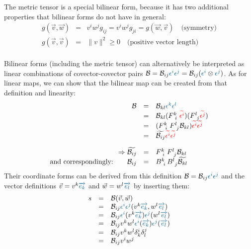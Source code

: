 The metric tensor is a special bilinear form, because it has two additional properties
that bilinear forms do not have in general:
\begin{equation}
    \label{eq:metric_tensor_special_additional_properties}
    \begin{array}{rcl}
        g(\vec{v},\vec{w}) &=& v^i w^j g_{ij} = v^i w^j g_{ji} = g(\vec{w},\vec{v})
        \quad\text{(symmetry)}\\
        g(\vec{v},\vec{v}) &=& \| v \|^2 \geq 0
        \quad\text{(positive vector length)}
    \end{array}
\end{equation} \\

Bilinear forms (including the metric tensor) can alternatively be interpreted as linear
combinations of covector-covector pairs $\mathcal{B} = \mathcal{B}_{ij}
\hdcbvc{i}\hdcbvc{j} = \mathcal{B}_{ij} (\hdcbvc{i} \otimes\hdcbvc{j})$. As for linear
maps, we can show that the bilinear map can be created from that definition and linearity:
\begin{equation}
    \begin{array}{rcl}
        \mathcal{B} & = & \mathcal{B}_{kl} \hdcbvc{k}\hdcbvc{l} \\
        & = & \mathcal{B}_{kl}(F^{k~}_{~i}\hdcbtvc{i})(F^{l~}_{~j}\hdcbtvc{j}) \\
        & = & (F^{k~}_{~i}  F^{l~}_{~j} \mathcal{B}_{kl})\hdcbtvc{i}\hdcbtvc{j} \\
        & = & \widetilde{\mathcal{B}_{ij}}\hdcbtvc{i}\hdcbtvc{j} \\
        \noalign{\vskip10pt}
        \Rightarrow \widetilde{\mathcal{B}_{ij}} & = & F^{k~}_{~i}  F^{l~}_{~j} \mathcal{B}_{kl} \\
        \text{and correspondingly:} \qquad\mathcal{B}_{ij}
        & = & B^{k~}_{~i}  B^{l~}_{~j} \widetilde{\mathcal{B}_{kl}}
    \end{array}
\end{equation}
Their coordinate forms can be derived from this definition $\mathcal{B} = \mathcal{B}_{ij}
\hdcbvc{i}\hdcbvc{j}$ and the vector definitions $\vec{v} = v^k \hdbv{k}$ and $\vec{w} =
w^l \hdbv{l}$ by inserting them:
\begin{equation}
    \begin{array}{rcl}
        s & = & \mathcal{B}(\vec{v},\vec{w}) \\
        & = & \mathcal{B}_{ij}\hdcbvc{i}\hdcbvc{j}(v^k \hdbv{k},w^l \hdbv{l}) \\
        & = & \mathcal{B}_{ij}\hdcbvc{i}(v^k \hdbv{k})\hdcbvc{j}(w^l \hdbv{l}) \\
        & = & \mathcal{B}_{ij}v^k w^l \hdcbvc{i}(\hdbv{k})\hdcbvc{j}(\hdbv{l}) \\
        & = & \mathcal{B}_{ij}v^k w^l \delta^i_k \delta^j_l \\
        & = & \mathcal{B}_{ij}v^i w^j 
    \end{array}
\end{equation} \\

